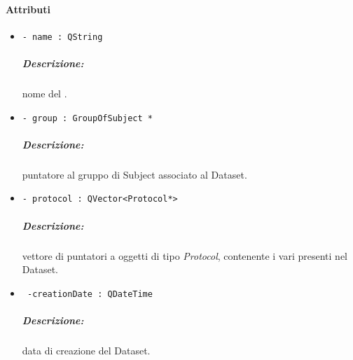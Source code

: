 \paragraph{Attributi}
	\begin{itemize}
		\item \color{blue}\verb!- name : QString !
		\color{black}
		\subparagraph{Descrizione:} nome del \dataset{}.
		
		\item \color{blue}\verb!- group : GroupOfSubject * !
		\color{black}
		\subparagraph{Descrizione:} puntatore al gruppo di Subject\g{} associato al Dataset\g{}.
	
		\item \color{teal}\verb!- protocol : QVector<Protocol*> !
		\color{black}
		\subparagraph{Descrizione:} vettore di puntatori a oggetti di tipo \textsl{Protocol}, contenente i vari \protocol{} presenti nel Dataset\g{}.
		
		\item \color{teal}\verb! -creationDate : QDateTime !
		\color{black}
		\subparagraph{Descrizione:} data di creazione del Dataset\g{}.

	\end{itemize}

\color{black}
